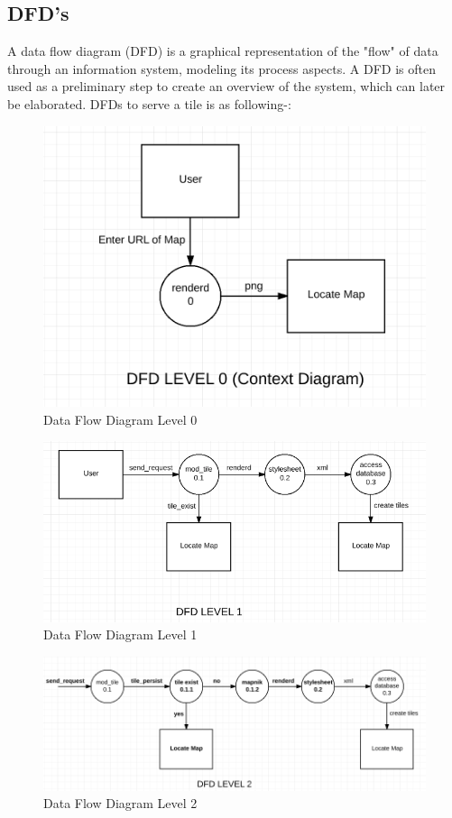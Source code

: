 \subsection{DFD's}
A data flow diagram (DFD) is a graphical representation of the "flow" of data through an information system, modeling its process aspects. A DFD is often used as a preliminary step to create an overview of the system, which can later be elaborated. DFDs to serve a tile is as following-:
\begin{figure}[h!]
	\centering
	\includegraphics[scale=0.6]{input/images/DFD_0.png}
	\caption{Data Flow Diagram Level 0}
\end{figure}
\begin{figure}[h!]
	        \centering
		        \includegraphics[scale=0.6]{input/images/DFD_1.png}
			        \caption{Data Flow Diagram Level 1}
\end{figure}
\begin{figure}[h!]
	        \centering
		        \includegraphics[scale=0.6]{input/images/DFD_2.png}
			        \caption{Data Flow Diagram Level 2}
\end{figure}

